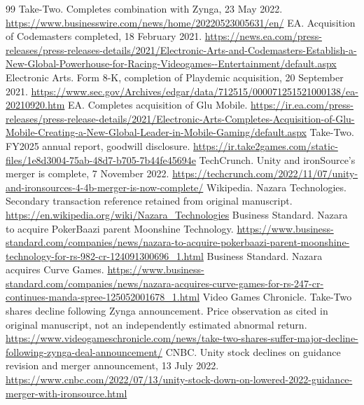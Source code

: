 \documentclass[11pt]{article}
\begin{document}
\begin{thebibliography}{99}
 Take-Two. Completes combination with Zynga, 23 May 2022. \url{https://www.businesswire.com/news/home/20220523005631/en/}
 EA. Acquisition of Codemasters completed, 18 February 2021. \url{https://news.ea.com/press-releases/press-releases-details/2021/Electronic-Arts-and-Codemasters-Establish-a-New-Global-Powerhouse-for-Racing-Videogames--Entertainment/default.aspx}
 Electronic Arts. Form 8-K, completion of Playdemic acquisition, 20 September 2021. \url{https://www.sec.gov/Archives/edgar/data/712515/000071251521000138/ea-20210920.htm}
 EA. Completes acquisition of Glu Mobile. \url{https://ir.ea.com/press-releases/press-release-details/2021/Electronic-Arts-Completes-Acquisition-of-Glu-Mobile-Creating-a-New-Global-Leader-in-Mobile-Gaming/default.aspx}
 Take-Two. FY2025 annual report, goodwill disclosure. \url{https://ir.take2games.com/static-files/1e8d3004-75ab-48d7-b705-7b44fe45694e}
 TechCrunch. Unity and ironSource's merger is complete, 7 November 2022. \url{https://techcrunch.com/2022/11/07/unity-and-ironsources-4-4b-merger-is-now-complete/}
 Wikipedia. Nazara Technologies. Secondary transaction reference retained from original manuscript. \url{https://en.wikipedia.org/wiki/Nazara_Technologies}
 Business Standard. Nazara to acquire PokerBaazi parent Moonshine Technology. \url{https://www.business-standard.com/companies/news/nazara-to-acquire-pokerbaazi-parent-moonshine-technology-for-rs-982-cr-124091300696_1.html}
 Business Standard. Nazara acquires Curve Games. \url{https://www.business-standard.com/companies/news/nazara-acquires-curve-games-for-rs-247-cr-continues-manda-spree-125052001678_1.html}
 Video Games Chronicle. Take-Two shares decline following Zynga announcement. Price observation as cited in original manuscript, not an independently estimated abnormal return. \url{https://www.videogameschronicle.com/news/take-two-shares-suffer-major-decline-following-zynga-deal-announcement/}
 CNBC. Unity stock declines on guidance revision and merger announcement, 13 July 2022. \url{https://www.cnbc.com/2022/07/13/unity-stock-down-on-lowered-2022-guidance-merger-with-ironsource.html}
\end{thebibliography}
\end{document}
